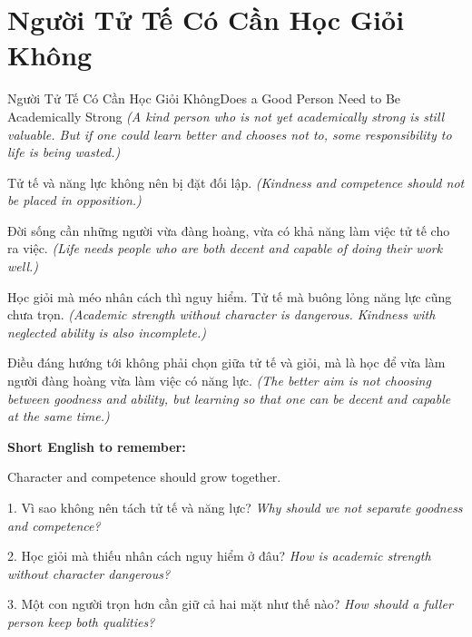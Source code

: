 \section{Người Tử Tế Có Cần Học Giỏi Không}
\begin{truyen}{Người Tử Tế Có Cần Học Giỏi Không}{Does a Good Person Need to Be Academically Strong}
\textit{(A kind person who is not yet academically strong is still valuable. But if one could learn better and chooses not to, some responsibility to life is being wasted.)}

Tử tế và năng lực không nên bị đặt đối lập.
\textit{(Kindness and competence should not be placed in opposition.)}

Đời sống cần những người vừa đàng hoàng, vừa có khả năng làm việc tử tế cho ra việc.
\textit{(Life needs people who are both decent and capable of doing their work well.)}

Học giỏi mà méo nhân cách thì nguy hiểm. Tử tế mà buông lỏng năng lực cũng chưa trọn.
\textit{(Academic strength without character is dangerous. Kindness with neglected ability is also incomplete.)}
\end{truyen}

\begin{baihoc}
Điều đáng hướng tới không phải chọn giữa tử tế và giỏi, mà là học để vừa làm người đàng hoàng vừa làm việc có năng lực.
\textit{(The better aim is not choosing between goodness and ability, but learning so that one can be decent and capable at the same time.)}
\end{baihoc}

\begin{ghinhoanh}
\textbf{Short English to remember:}

Character and competence should grow together.

\end{ghinhoanh}

\begin{tuhocnhanh}
1. Vì sao không nên tách tử tế và năng lực? \textit{Why should we not separate goodness and competence?}

2. Học giỏi mà thiếu nhân cách nguy hiểm ở đâu? \textit{How is academic strength without character dangerous?}

3. Một con người trọn hơn cần giữ cả hai mặt như thế nào? \textit{How should a fuller person keep both qualities?}
\end{tuhocnhanh}
\ngancach

